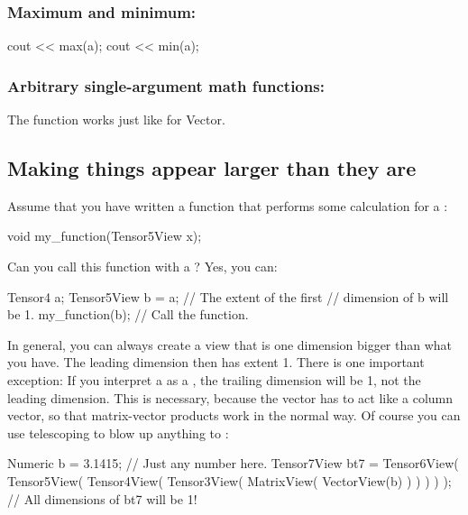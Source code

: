 \subsubsection{Maximum and minimum:}
\begin{code}
cout << max(a);
cout << min(a);
\end{code}

\subsubsection{Arbitrary single-argument math functions:}

The function  works just like for Vector.

\subsection{Making things appear larger than they are}

Assume that you have written a function that performs some calculation
for a :
\begin{code}
void my_function(Tensor5View x);
\end{code}

\noindent Can you call this function with a ? Yes, you can:
\begin{code}
Tensor4 a;                      
Tensor5View b = a;              // The extent of the first
                                // dimension of b will be 1.
my_function(b);                 // Call the function.
\end{code}

In general, you can always create a view that is one dimension bigger
than what you have. The leading dimension then has extent 1. There is
one important exception: If you interpret a  as a
, the trailing dimension will be 1, not the leading
dimension. This is necessary, because the vector has to act like a
column vector, so that matrix-vector products work in the normal way.
Of course you can use telescoping to blow up anything to
: 

\begin{code}
Numeric b = 3.1415;             // Just any number here.
Tensor7View bt7 =
  Tensor6View(
     Tensor5View(
        Tensor4View(
           Tensor3View(
              MatrixView(
                 VectorView(b)
              )
           )
        )
     )
  );                 // All dimensions of bt7 will be 1!
\end{code}

